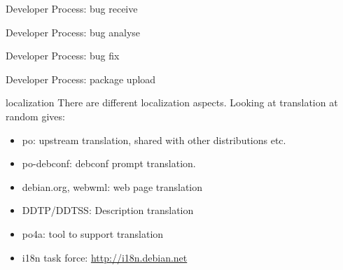 \documentclass[cjk,dvipdfm,12pt]{beamer}
\begin{document}
\begin{frame}{Developer Process: bug receive}
\end{frame}

\begin{frame}{Developer Process: bug analyse}

\end{frame}


\begin{frame}{Developer Process: bug fix}

\end{frame}

\begin{frame}{Developer Process: package upload}

\end{frame}

\begin{frame}{localization}
 There are different localization aspects. Looking at translation at
 random gives:
\begin{itemize}
 \item po: upstream translation, shared with other distributions etc.
 \item po-debconf: debconf prompt translation.
 \item debian.org, webwml: web page translation
 \item DDTP/DDTSS: Description translation
 \item po4a: tool to support translation
 \item i18n task force: \url{http://i18n.debian.net}
\end{itemize}
\end{frame}
\end{document}
